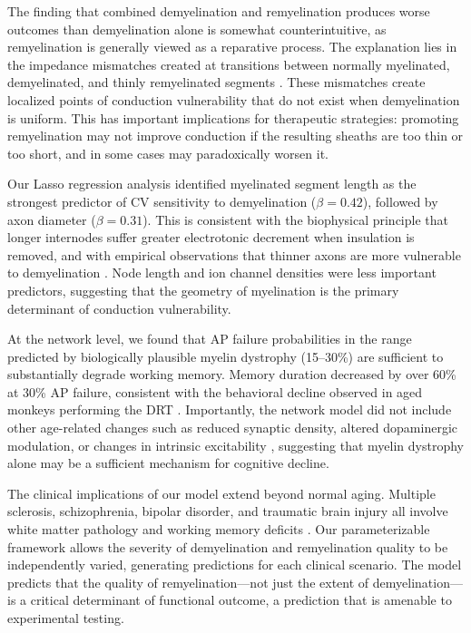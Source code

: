 \documentclass[11pt]{article}
\begin{document}
The finding that combined demyelination and remyelination produces worse outcomes than demyelination alone is somewhat counterintuitive, as remyelination is generally viewed as a reparative process. The explanation lies in the impedance mismatches created at transitions between normally myelinated, demyelinated, and thinly remyelinated segments \citep{scurfield2018}. These mismatches create localized points of conduction vulnerability that do not exist when demyelination is uniform. This has important implications for therapeutic strategies: promoting remyelination may not improve conduction if the resulting sheaths are too thin or too short, and in some cases may paradoxically worsen it.

Our Lasso regression analysis identified myelinated segment length as the strongest predictor of CV sensitivity to demyelination ($\beta = 0.42$), followed by axon diameter ($\beta = 0.31$). This is consistent with the biophysical principle that longer internodes suffer greater electrotonic decrement when insulation is removed, and with empirical observations that thinner axons are more vulnerable to demyelination \citep{wang2006}. Node length and ion channel densities were less important predictors, suggesting that the geometry of myelination is the primary determinant of conduction vulnerability.

At the network level, we found that AP failure probabilities in the range predicted by biologically plausible myelin dystrophy (15--30\%) are sufficient to substantially degrade working memory. Memory duration decreased by over 60\% at 30\% AP failure, consistent with the behavioral decline observed in aged monkeys performing the DRT \citep{chen2004}. Importantly, the network model did not include other age-related changes such as reduced synaptic density, altered dopaminergic modulation, or changes in intrinsic excitability \citep{ibanez2020}, suggesting that myelin dystrophy alone may be a sufficient mechanism for cognitive decline.

The clinical implications of our model extend beyond normal aging. Multiple sclerosis, schizophrenia, bipolar disorder, and traumatic brain injury all involve white matter pathology and working memory deficits \citep{fields2008, bartzokis2004}. Our parameterizable framework allows the severity of demyelination and remyelination quality to be independently varied, generating predictions for each clinical scenario. The model predicts that the quality of remyelination---not just the extent of demyelination---is a critical determinant of functional outcome, a prediction that is amenable to experimental testing.
\end{document}

